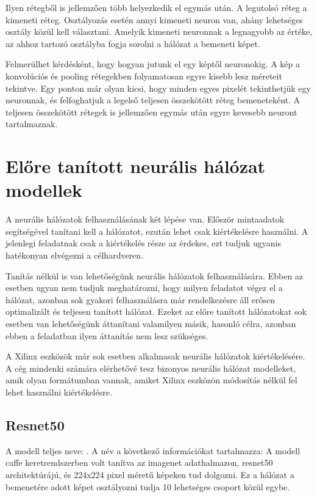 Ilyen rétegből is jellemzően több helyezkedik el egymás után. A legutolsó réteg a kimeneti réteg. Osztályozás esetén annyi kimeneti neuron van, ahány lehetséges osztály közül kell választani. Amelyik kimeneti neuronnak a legnagyobb az értéke, az ahhoz tartozó osztályba fogja sorolni a hálózat a bemeneti képet.

Felmerülhet kérdésként, hogy hogyan jutunk el egy képtől neuronokig. A kép a konvolúciós és pooling rétegekben folyamatosan egyre kisebb lesz méreteit tekintve. Egy ponton már olyan kicsi, hogy minden egyes pixelét tekinthetjük egy neuronnak, és felfoghatjuk a legelső teljesen összekötött réteg bemeneteként. A teljesen összekötött rétegek is jellemzően egymás után egyre kevesebb neuront tartalmaznak.

\section{Előre tanított neurális hálózat modellek}

A neurális hálózatok felhasználásának két lépése van. Először mintaadatok segítségével tanítani kell a hálózatot, ezután lehet csak kiértékelésre használni. A jelenlegi feladatnak csak a kiértékelés része az érdekes, ezt tudjuk ugyanis hatékonyan elvégezni a célhardveren.

Tanítás nélkül is van lehetőségünk neurális hálózatok felhasználására. Ebben az esetben ugyan nem tudjuk meghatározni, hogy milyen feladatot végez el a hálózat, azonban sok gyakori felhasználásra már rendelkezésre áll erősen optimalizált és teljesen tanított hálózat. Ezeket az előre tanított hálózatokat sok esetben van lehetőségünk áttanítani valamilyen másik, hasonló célra, azonban ebben a feladatban ilyen áttanítás nem lesz szükséges.

A Xilinx eszközök már sok esetben alkalmasak neurális hálózatok kiértékelésére. A cég mindenki számára elérhetővé tesz bizonyos neurális hálózat modelleket, amik olyan formátumban vannak, amiket Xilinx eszközön módosítás nélkül fel lehet használni kiértékelésre.
\cite{ModelZoo}

\subsection{Resnet50}
A modell teljes neve: . A név a következő információkat tartalmazza: A modell caffe keretrendszerben volt tanítva az imagenet adathalmazon, resnet50 architektúrájú, és 224x224 pixel méretű képeken tud dolgozni. Ez a hálózat a bemenetére adott képet osztályozni tudja 10 lehetséges csoport közül egybe.

